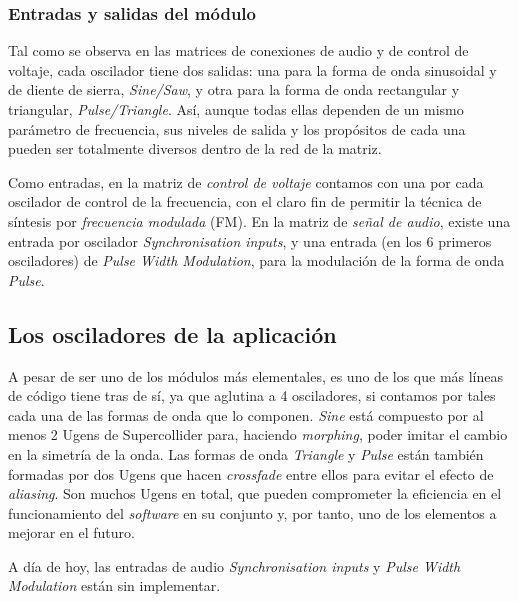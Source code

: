 \subsubsection{Entradas y salidas del módulo}
Tal como se observa en las matrices de conexiones de audio y de control de voltaje, cada oscilador tiene dos salidas: una para la forma de onda sinusoidal y de diente de sierra, \textit{Sine/Saw}, y otra para la forma de onda rectangular y triangular, \textit{Pulse/Triangle}. Así, aunque todas ellas dependen de un mismo parámetro de frecuencia, sus niveles de salida y los propósitos de cada una pueden ser totalmente diversos dentro de la red de la matriz. 

Como entradas, en la matriz de \textit{control de voltaje} contamos con una por cada oscilador de control de la frecuencia, con el claro fin de permitir la técnica de síntesis por \textit{frecuencia modulada} (FM). En la matriz de \textit{señal de audio}, existe una entrada por oscilador \textit{Synchronisation inputs}, y una entrada (en los 6 primeros osciladores) de \textit{Pulse Width Modulation}, para la modulación de la forma de onda \textit{Pulse}.

\subsection{Los osciladores de la aplicación \appName}
A pesar de ser uno de los módulos más elementales, es uno de los que más líneas de código tiene tras de sí, ya que aglutina a 4 osciladores, si contamos por tales cada una de las formas de onda que lo componen. \textit{Sine} está compuesto por al menos 2 Ugens de Supercollider para, haciendo \textit{morphing}, poder imitar el cambio en la simetría de la onda. Las formas de onda \textit{Triangle} y \textit{Pulse} están también formadas por dos Ugens que hacen \textit{crossfade} entre ellos para evitar el efecto de \textit{aliasing}. Son muchos Ugens en total, que pueden comprometer la eficiencia en el funcionamiento del \textit{software} en su conjunto y, por tanto, uno de los elementos a mejorar en el futuro.

A día de hoy, las entradas de audio \textit{Synchronisation inputs} y \textit{Pulse Width Modulation} están sin implementar.
